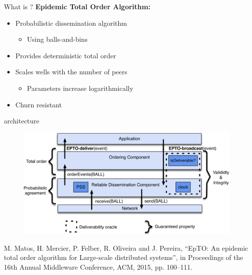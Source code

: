 \subtitle[Description]{Description}

\begin{frame}{What is \epto{}?}
	\textbf{Epidemic Total Order Algorithm:}
	\begin{itemize}
		\item Probabilistic dissemination algorithm
			\begin{itemize}
				\item Using balls-and-bins
			\end{itemize}
		\item Provides deterministic total order
		\item Scales wells with the number of peers
			\begin{itemize}
				\item Parameters increase logarithmically
			\end{itemize}
		\item Churn resistant
	\end{itemize}
\end{frame}


\begin{frame}{\epto{} architecture}
    \begin{figure}
        \includegraphics[scale=0.5]{figures/architecture}
    \end{figure}
\tiny{M. Matos, H. Mercier, P. Felber, R. Oliveira and J. Pereira, “EpTO: An epidemic total order algorithm for Large-scale distributed systems”, in Proceedings of the 16th Annual Middleware Conference, ACM, 2015, pp. 100–111.
}
\end{frame}

